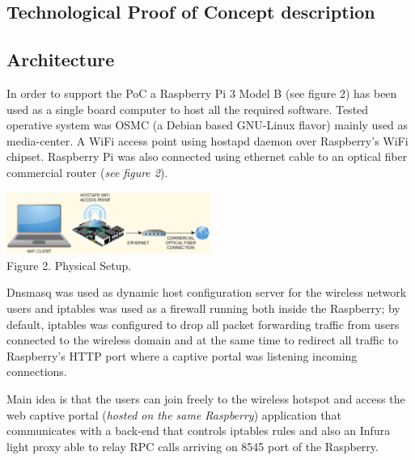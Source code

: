 \documentclass[12pt]{amsart}
\begin{document}
\begin{multicols}{2}
\section{Technological Proof of Concept description}

\subsection{Architecture}
\label{ch:architecture}
\vspace{0.35cm}

In order to support the PoC a
Raspberry Pi 3 Model B (see figure 2) has been used
as a single board computer to host all the required software.
Tested operative system was OSMC\cite{osmc} (a Debian based
GNU-Linux flavor) mainly used as media-center.
A WiFi access point using
hostapd\cite{hostapd} daemon over Raspberry's WiFi chipset.
Raspberry Pi was also connected using ethernet cable
to an optical fiber commercial router (\textit{see figure 2}).

\begin{center}
  \includegraphics[keepaspectratio, width=0.5\textwidth]{images/physical-setup-y.eps}
\\
Figure 2. Physical Setup.
\\
\end{center}

\vspace{0.35cm}

Dnsmasq\cite{dnsmasq} was used
as dynamic host configuration server for the wireless
network users and
iptables\cite{iptables} was used as a firewall running
both inside the Raspberry; by default, iptables
was configured to
drop all packet
forwarding traffic from users connected to the wireless
domain and at the same time to redirect all
traffic to Raspberry's HTTP port where a
captive portal was listening incoming connections.

\vspace{0.35cm}

Main idea is that the users can join freely
to the wireless hotspot and access the web captive portal
(\textit{hosted on the same Raspberry}) application that
communicates with a back-end that controls iptables
rules and also an Infura light proxy able to relay RPC
calls arriving on 8545 port of the Raspberry.


\end{multicols}
\end{document}
